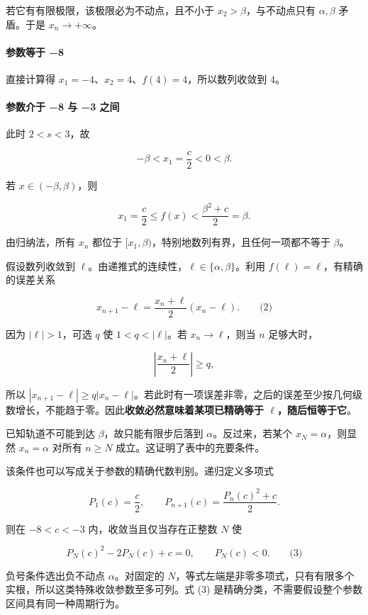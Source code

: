 \documentclass[11pt,a4paper]{article}
\begin{document}
若它有有限极限，该极限必为不动点，且不小于 \(x_2>\beta\)，与不动点只有
\(\alpha,\beta\) 矛盾。于是 \(x_n\to+\infty\)。

\paragraph{参数等于 −8}\label{ux53c2ux6570ux7b49ux4e8e-8}

直接计算得 \(x_1=-4\)、\(x_2=4\)、\(f(4)=4\)，所以数列收敛到 \(4\)。

\paragraph{参数介于 −8 与 −3
之间}\label{ux53c2ux6570ux4ecbux4e8e-8-ux4e0e-3-ux4e4bux95f4}

此时 \(2<s<3\)，故

\[
-\beta<x_1=\frac c2<0<\beta.
\]

若 \(x\in(-\beta,\beta)\)，则

\[
x_1=\frac c2\le f(x)<\frac{\beta^2+c}{2}=\beta.
\]

由归纳法，所有 \(x_n\) 都位于
\([x_1,\beta)\)，特别地数列有界，且任何一项都不等于 \(\beta\)。

假设数列收敛到
\(\ell\)。由递推式的连续性，\(\ell\in\{\alpha,\beta\}\)。利用
\(f(\ell)=\ell\)，有精确的误差关系

\[
x_{n+1}-\ell
=\frac{x_n+\ell}{2}(x_n-\ell).
\qquad\text{(2)}
\]

因为 \(|\ell|>1\)，可选 \(q\) 使 \(1<q<|\ell|\)。若 \(x_n\to\ell\)，则当
\(n\) 足够大时，

\[
\left|\frac{x_n+\ell}{2}\right|\ge q,
\]

所以
\(|x_{n+1}-\ell|\ge q|x_n-\ell|\)。若此时有一项误差非零，之后的误差至少按几何级数增长，不能趋于零。因此\textbf{收敛必然意味着某项已精确等于
\(\ell\)，随后恒等于它}。

已知轨道不可能到达 \(\beta\)，故只能有限步后落到
\(\alpha\)。反过来，若某个 \(x_N=\alpha\)，则显然 \(x_n=\alpha\) 对所有
\(n\ge N\) 成立。这证明了表中的充要条件。

该条件也可以写成关于参数的精确代数判别。递归定义多项式

\[
P_1(c)=\frac c2,\qquad
P_{n+1}(c)=\frac{P_n(c)^2+c}{2}.
\]

则在 \(-8<c<-3\) 内，收敛当且仅当存在正整数 \(N\) 使

\[
\boxed{P_N(c)^2-2P_N(c)+c=0,\qquad P_N(c)<0.}
\qquad\text{(3)}
\]

负号条件选出负不动点 \(\alpha\)。对固定的
\(N\)，等式左端是非零多项式，只有有限多个实根，所以这类特殊收敛参数至多可列。式
(3) 是精确分类，不需要假设整个参数区间具有同一种周期行为。
\end{document}
